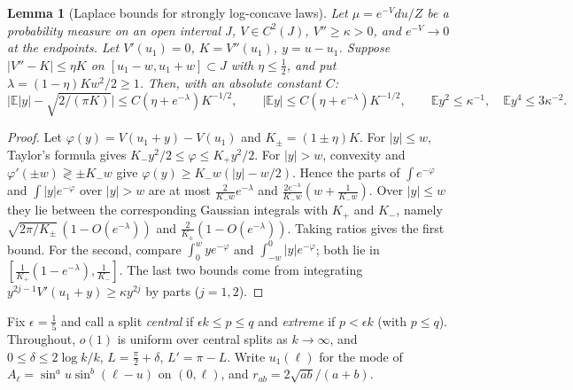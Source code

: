 \documentclass[11pt]{amsart}
\newtheorem{lemma}[theorem]{Lemma}
\theoremstyle{definition}
\begin{document}
\begin{lemma}[Laplace bounds for strongly log-concave laws]\label{lem:laplace}
Let $\mu=e^{-V}du/Z$ be a probability measure on an open interval $J$, $V\in C^2(J)$, $V''\ge\kappa>0$, and $e^{-V}\to0$ at the
endpoints. Let $V'(u_1)=0$, $K=V''(u_1)$, $y=u-u_1$. Suppose $|V''-K|\le\eta K$ on $[u_1-w,u_1+w]\subset J$ with $\eta\le\frac12$, and
put $\lambda=(1-\eta)Kw^2/2\ge1$. Then, with an absolute constant $C$:
\[
\Big|\mathbb E|y|-\sqrt{2/(\pi K)}\Big|\le C(\eta+e^{-\lambda})K^{-1/2},\qquad |\mathbb Ey|\le C(\eta+e^{-\lambda})K^{-1/2},\qquad
\mathbb Ey^2\le\kappa^{-1},\quad\mathbb Ey^4\le3\kappa^{-2}.
\]
\end{lemma}
\begin{proof}
Let $\varphi(y)=V(u_1+y)-V(u_1)$ and $K_\pm=(1\pm\eta)K$. For $|y|\le w$, Taylor's formula gives $K_-y^2/2\le\varphi\le K_+y^2/2$. For
$|y|>w$, convexity and $\varphi'(\pm w)\gtrless\pm K_-w$ give $\varphi(y)\ge K_-w(|y|-w/2)$. Hence the parts of $\int e^{-\varphi}$ and
$\int|y|e^{-\varphi}$ over $|y|>w$ are at most $\frac2{K_-w}e^{-\lambda}$ and $\frac{2e^{-\lambda}}{K_-w}(w+\frac1{K_-w})$. Over $|y|\le w$
they lie between the corresponding Gaussian integrals with $K_+$ and $K_-$, namely $\sqrt{2\pi/K_\pm}\,(1-O(e^{-\lambda}))$ and
$\frac2{K_\pm}(1-O(e^{-\lambda}))$. Taking ratios gives the first bound. For the second, compare $\int_0^wye^{-\varphi}$ and
$\int_{-w}^0|y|e^{-\varphi}$; both lie in $[\frac1{K_+}(1-e^{-\lambda}),\frac1{K_-}]$. The last two bounds come from integrating
$y^{2j-1}V'(u_1+y)\ge\kappa y^{2j}$ by parts ($j=1,2$).
\end{proof}

Fix $\epsilon=\frac15$ and call a split \emph{central} if $\epsilon k\le p\le q$ and \emph{extreme} if $p<\epsilon k$ (with $p\le q$).
Throughout, $o(1)$ is uniform over central splits as $k\to\infty$, and $0\le\delta\le2\log k/k$, $L=\frac\pi2+\delta$, $L'=\pi-L$.
Write $u_1(\ell)$ for the mode of $A_\ell=\sin^au\sin^b(\ell-u)$ on $(0,\ell)$, and $r_{ab}=2\sqrt{ab}/(a+b)$.
\end{document}
